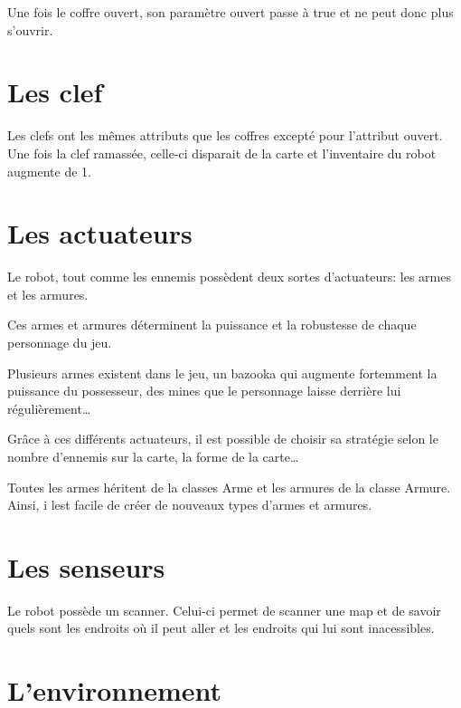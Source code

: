 \documentclass[a4paper 12pts]{article}
\begin{document}
Une fois le coffre ouvert, son paramètre ouvert passe à true et ne peut donc plus s'ouvrir.


\section{Les clef}

Les clefs ont les mêmes attributs que les coffres excepté pour l'attribut ouvert. Une fois la clef ramassée, celle-ci disparait de la carte et l'inventaire du robot augmente de 1.

\section{Les actuateurs}

Le robot, tout comme les ennemis possèdent deux sortes d'actuateurs: les armes et les armures.

Ces armes et armures déterminent la puissance et la robustesse de chaque personnage du jeu.

Plusieurs armes existent dans le jeu, un bazooka qui augmente fortemment la puissance du possesseur, des mines que le personnage laisse derrière lui régulièrement\ldots

Grâce à ces différents actuateurs, il est possible de choisir sa stratégie selon le nombre d'ennemis sur la carte, la forme de la carte\ldots

Toutes les armes héritent de la classes Arme et les armures de la classe Armure. Ainsi, i lest facile de créer de nouveaux types d'armes et armures.

\section{Les senseurs}

Le robot possède un scanner. Celui-ci permet de scanner une map et de savoir quels sont les endroits où il peut aller et les endroits qui lui sont inacessibles.

\newpage
\section{L'environnement}
\end{document}
